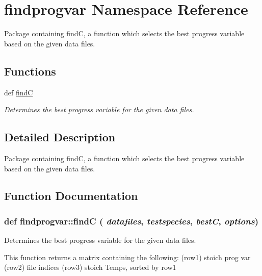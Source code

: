 \hypertarget{namespacefindprogvar}{
\section{findprogvar Namespace Reference}
\label{dd/d50/namespacefindprogvar}
}


Package containing findC, a function which selects the best progress variable based on the given data files.  


\subsection*{Functions}
\begin{DoxyCompactItemize}
\item 
def \hyperlink{namespacefindprogvar_a124b8c329615516d97e63bee78f994c9}{findC}
\begin{DoxyCompactList}\small\item\em Determines the best progress variable for the given data files. \item\end{DoxyCompactList}\end{DoxyCompactItemize}


\subsection{Detailed Description}
Package containing findC, a function which selects the best progress variable based on the given data files. 

\subsection{Function Documentation}
\hypertarget{namespacefindprogvar_a124b8c329615516d97e63bee78f994c9}{
\subsubsection[{findC}]{\setlength{\rightskip}{0pt plus 5cm}def findprogvar::findC ( {\em datafiles}, \/   {\em testspecies}, \/   {\em bestC}, \/   {\em options})}}
\label{dd/d50/namespacefindprogvar_a124b8c329615516d97e63bee78f994c9}


Determines the best progress variable for the given data files. 

This function returns a matrix containing the following: (row1) stoich prog var (row2) file indices (row3) stoich Temps, sorted by row1

